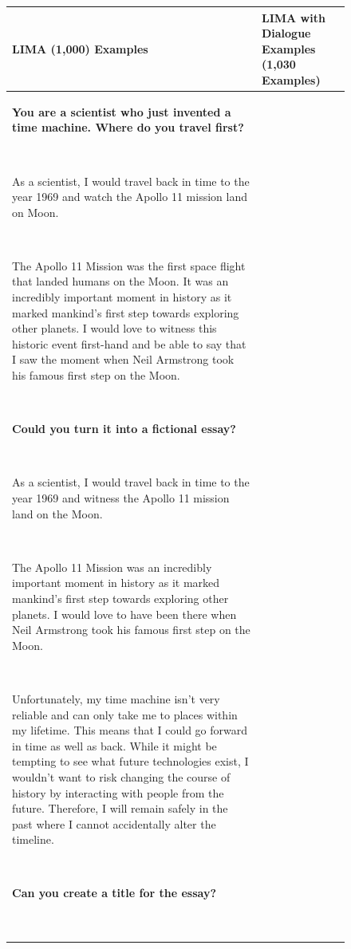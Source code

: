  \begin{figure}[p]
    \scriptsize
    \centering
    \begin{tabular}{@{}p{}p{}@{}}
    \toprule
    \textbf{LIMA (1,000) Examples} & \textbf{LIMA with Dialogue Examples (1,030 Examples)} \\
    \midrule
    \textcolor[HTML]{3078BE}{\textbf{You are a scientist who just invented a time machine. Where do you travel first?}}
    
    ~
    
    As a scientist, I would travel back in time to the year 1969 and watch the Apollo 11 mission land on Moon.
    
    ~
    
    The Apollo 11 Mission was the first space flight that landed humans on the Moon. It was an incredibly important moment in history as it marked mankind's first step towards exploring other planets. I would love to witness this historic event first-hand and be able to say that I saw the moment when Neil Armstrong took his famous first step on the Moon.
    
    ~
    
    \textcolor[HTML]{3078BE}{\textbf{Could you turn it into a fictional essay?}}
    
    ~
    
    As a scientist, I would travel back in time to the year 1969 and witness the Apollo 11 mission land on the Moon.
    
    ~
    
    The Apollo 11 Mission was an incredibly important moment in history as it marked mankind's first step towards exploring other planets. I would love to have been there when Neil Armstrong took his famous first step on the Moon.
    
    ~
    
    Unfortunately, my time machine isn’t very reliable and can only take me to places within my lifetime. This means that I could go forward in time as well as back. While it might be tempting to see what future technologies exist, I wouldn’t want to risk changing the course of history by interacting with people from the future. Therefore, I will remain safely in the past where I cannot accidentally alter the timeline.
    
    ~
    
    \textcolor[HTML]{3078BE}{\textbf{Can you create a title for the essay?}}
    
    ~
    

\end{tabular}
\end{figure}
